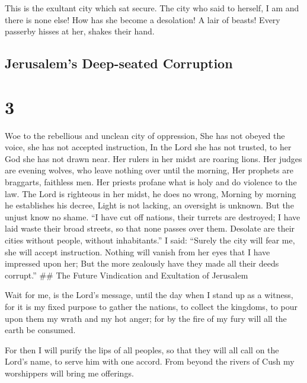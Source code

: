  This is the exultant city which sat secure. The city who
said to herself, I am and there is none else! How has she become a
desolation! A lair of beasts! Every passerby hisses at her, shakes their
hand.

\hypertarget{jerusalems-deep-seated-corruption}{%
\subsection{Jerusalem's Deep-seated
Corruption}\label{jerusalems-deep-seated-corruption}}

\hypertarget{section-2}{%
\section{3}\label{section-2}}

 Woe to the rebellious and unclean city of oppression,
 She has not obeyed the voice, she has not accepted
instruction, In the Lord she has not trusted, to her God she has not
drawn near.  Her rulers in her midst are roaring lions. Her
judges are evening wolves, who leave nothing over until the morning,
 Her prophets are braggarts, faithless men. Her priests
profane what is holy and do violence to the law.  The Lord
is righteous in her midst, he does no wrong, Morning by morning he
establishes his decree, Light is not lacking, an oversight is unknown.
But the unjust know no shame.  ``I have cut off nations,
their turrets are destroyed; I have laid waste their broad streets, so
that none passes over them. Desolate are their cities without people,
without inhabitants.''  I said: ``Surely the city will fear
me, she will accept instruction. Nothing will vanish from her eyes that
I have impressed upon her; But the more zealously have they made all
their deeds corrupt.'' \#\# The Future Vindication and Exultation of
Jerusalem

 Wait for me, is the Lord's message, until the day when I
stand up as a witness, for it is my fixed purpose to gather the nations,
to collect the kingdoms, to pour upon them my wrath and my hot anger;
for by the fire of my fury will all the earth be consumed.

 For then I will purify the lips of all peoples, so that
they will all call on the Lord's name, to serve him with one accord.
 From beyond the rivers of Cush my worshippers will bring
me offerings.

